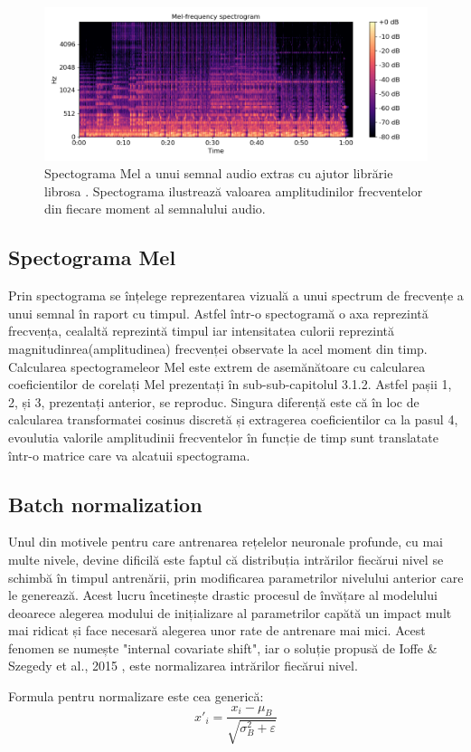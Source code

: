 \documentclass[a4paper,12pt]{book}
\begin{document}
			\begin{figure}[h]
				\centering
				\includegraphics[scale=0.67]{melspectogram}
				\caption{Spectograma Mel a unui semnal audio extras cu ajutor librărie librosa \cite{librosa}. Spectograma ilustrează valoarea amplitudinilor frecventelor din fiecare moment al semnalului audio.}
				\label{fig:melspec}
			\end{figure}
			
			\subsection{Spectograma Mel} \label{mel}
				Prin spectograma se înțelege reprezentarea vizuală a unui spectrum de frecvențe a unui semnal în raport cu timpul. Astfel într-o spectogramă o axa reprezintă frecvența, cealaltă reprezintă timpul iar intensitatea culorii reprezintă magnitudinrea(amplitudinea) frecvenței observate la acel moment din timp. Calcularea spectogrameleor Mel este extrem de asemănătoare cu calcularea coeficientilor de corelați Mel prezentați în sub-sub-capitolul 3.1.2. Astfel pașii 1, 2, și 3, prezentați anterior, se reproduc. Singura diferență este că în loc de calcularea transformatei cosinus discretă și extragerea coeficientilor ca la pasul 4, evoulutia valorile amplitudinii frecventelor în funcție de timp sunt translatate într-o matrice care va alcatuii spectograma. \par
			\subsection{Batch normalization} \label{batch-norn}
				Unul din motivele pentru care antrenarea rețelelor neuronale profunde, cu mai multe nivele, devine dificilă este faptul că distribuția intrărilor fiecărui nivel se schimbă în timpul antrenării, prin modificarea parametrilor nivelului anterior care le generează. Acest lucru încetinește drastic procesul de învățare al modelului deoarece alegerea modului de inițializare al parametrilor capătă un impact mult mai ridicat și face necesară alegerea unor rate de antrenare mai mici. Acest fenomen se numește "internal covariate shift", iar o soluție propusă de Ioffe \& Szegedy et al., 2015 \cite{batch_norm}, este normalizarea intrărilor fiecărui nivel. \par Formula pentru normalizare este cea generică:
				\begin{equation*}
					x'_i = \frac{x_i - \mu_B}{\sqrt{\sigma^2_B +  \varepsilon}}
				\end{equation*}
				
\end{document}
